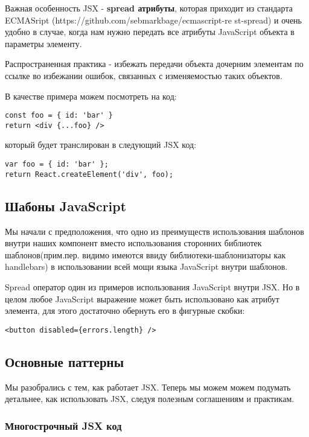 Важная особенность JSX - \textbf{spread атрибуты}, которая приходит из стандарта ECMASript (https://github.com/sebmarkbage/ecmascript-re st-spread) и очень удобно в случае, когда нам нужно передать все атрибуты JavaScript объекта в параметры элементу.

Распространенная практика - избежать передачи объекта дочерним элементам по ссылке во избежании ошибок, связанных с изменяемостью таких объектов.

В качестве примера можем посмотреть на код:

\begin{lstlisting}
const foo = { id: 'bar' }
return <div {...foo} />
\end{lstlisting}
   
который будет транслирован в следующий JSX код:

\begin{lstlisting}
var foo = { id: 'bar' };
return React.createElement('div', foo);
\end{lstlisting}
   
\subsection*{Шабоны JavaScript}

Мы начали с предположения, что одно из преимуществ использования шаблонов внутри наших компонент вместо использования сторонних библиотек шаблонов(прим.пер. видимо имеются ввиду библиотеки-шаблонизаторы как handlebars) в использовании всей мощи языка JavaScript внутри шаблонов.

Spread оператор один из примеров использования JavaScript внутри JSX. Но в целом любое JavaScript выражение может быть использовано как атрибут элемента, для этого достаточно обернуть его в фигурные скобки:

\begin{lstlisting}
<button disabled={errors.length} />
\end{lstlisting}

\subsection*{Основные паттерны}

Мы разобрались с тем, как работает JSX. Теперь мы можем можем подумать детальнее, как использовать JSX, следуя полезным соглашениям и практикам.

\subsubsection*{Многострочный JSX код}

